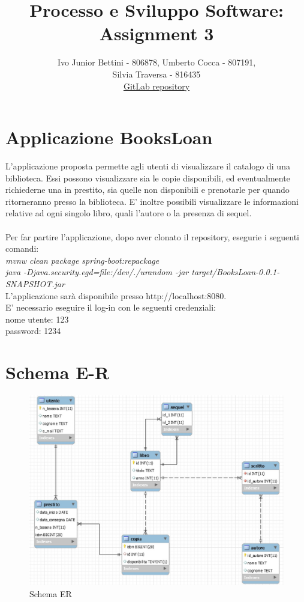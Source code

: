 \documentclass[a4paper,10pt]{article}
\title{Processo e Sviluppo Software: Assignment 3}
\author{Ivo Junior Bettini - 806878, Umberto Cocca - 807191, \\Silvia Traversa - 816435\\
\href{https://gitlab.com/s.traversa/2019_assignment3_booksloan}{GitLab repository}}
\date{}
\begin{document}
\maketitle 


\section*{Applicazione BooksLoan}
L'applicazione proposta permette agli utenti di visualizzare il catalogo di una biblioteca. Essi possono visualizzare sia le copie disponibili, ed eventualmente richiederne una in prestito, sia quelle non disponibili e prenotarle per quando ritorneranno presso la biblioteca.
E' inoltre possibili visualizzare le informazioni relative ad ogni singolo libro, quali l'autore o la presenza di sequel. \\\\
Per far partire l'applicazione, dopo aver clonato il repository, esegurie i seguenti comandi:\\
\textit{mvnw clean package spring-boot:repackage}\\
\textit{java -Djava.security.egd=file:/dev/./urandom -jar target/BooksLoan-0.0.1-SNAPSHOT.jar}\\
L'applicazione sarà disponibile presso http://localhost:8080.\\
E' necessario eseguire il log-in con le seguenti credenziali:\\
nome utente: 123\\
password: 1234

\section*{Schema E-R}

\begin{figure}[H]
	\centering
	\includegraphics[width=0.7\linewidth]{images/ERdiagram}
	\caption[Schema ER]{Schema ER}
	\label{fig:re}
\end{figure}
\end{document}
